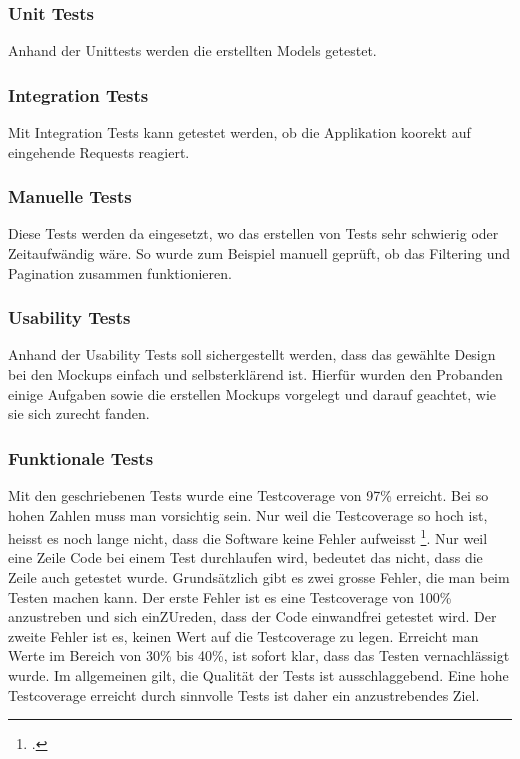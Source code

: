 \subsubsection*{Unit Tests}
Anhand der Unittests werden die erstellten Models getestet.

\subsubsection*{Integration Tests}
Mit Integration Tests kann getestet werden, ob die Applikation koorekt auf eingehende Requests reagiert.

\subsubsection*{Manuelle Tests}
Diese Tests werden da eingesetzt, wo das erstellen von Tests sehr schwierig oder Zeitaufwändig wäre. So wurde zum Beispiel manuell geprüft, ob das Filtering und Pagination zusammen funktionieren.

\subsubsection*{Usability Tests}
Anhand der Usability Tests soll sichergestellt werden, dass das gewählte Design bei den Mockups einfach und selbsterklärend ist. Hierfür wurden den Probanden einige Aufgaben sowie die erstellen Mockups vorgelegt und darauf geachtet, wie sie sich zurecht fanden.


\subsubsection{Funktionale Tests}
Mit den geschriebenen Tests wurde eine Testcoverage von 97\% erreicht. Bei so hohen Zahlen muss man vorsichtig sein. Nur weil die Testcoverage so hoch ist, heisst es noch lange nicht, dass die Software keine Fehler aufweisst \footcite{test_coverage}. Nur weil eine Zeile Code bei einem Test durchlaufen wird, bedeutet das nicht, dass die Zeile auch getestet wurde. Grundsätzlich gibt es zwei grosse Fehler, die man beim Testen machen kann. Der erste Fehler ist es eine Testcoverage von 100\% anzustreben und sich einZUreden, dass der Code einwandfrei getestet wird. Der zweite Fehler ist es, keinen Wert auf die Testcoverage zu legen. Erreicht man Werte im Bereich von 30\% bis 40\%, ist sofort klar, dass das Testen vernachlässigt wurde. Im allgemeinen gilt, die Qualität der Tests ist ausschlaggebend. Eine hohe Testcoverage erreicht durch sinnvolle Tests ist daher ein anzustrebendes Ziel. 

